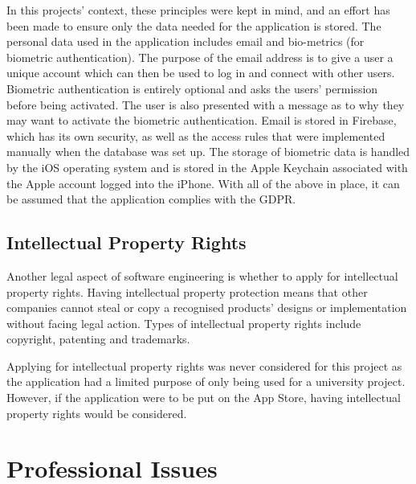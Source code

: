 	    In this projects' context, these principles were kept in mind, and an effort has been made to ensure only the data needed for the application is stored.  The personal data used in the application includes email and bio-metrics (for biometric authentication).  The purpose of the email address is to give a user a unique account which can then be used to log in and connect with other users.  Biometric authentication is entirely optional and asks the users' permission before being activated.  The user is also presented with a message as to why they may want to activate the biometric authentication.  Email is stored in Firebase, which has its own security, as well as the access rules that were implemented manually when the database was set up.  The storage of biometric data is handled by the iOS operating system and is stored in the Apple Keychain associated with the Apple account logged into the iPhone.  With all of the above in place, it can be assumed that the application complies with the GDPR.
	    
	    \subsection{Intellectual Property Rights}
	    Another legal aspect of software engineering is whether to apply for intellectual property rights.  Having intellectual property protection means that other companies cannot steal or copy a recognised products' designs or implementation without facing legal action.  Types of intellectual property rights include copyright, patenting and trademarks\cite{intellectual_property}.
	    
	    Applying for intellectual property rights was never considered for this project as the application had a limited purpose of only being used for a university project.  However, if the application were to  be put on the App Store, having intellectual property rights would  be considered.
	    
	\section{Professional Issues}
	    \label{sec:issues_professional}
	    

